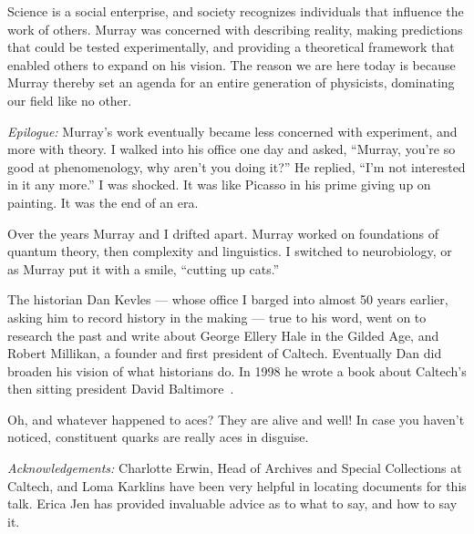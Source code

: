 \documentclass[12pt]{article}
\begin{document}
Science is a social enterprise, and society recognizes individuals that influence the work of others. Murray was concerned with describing reality, making predictions that could be tested experimentally, and providing a theoretical framework that enabled others to expand on his vision. The reason we are here today is because Murray thereby set an agenda for an entire generation of physicists, dominating our field like no other.

{\it Epilogue:} Murray's work eventually became less concerned with experiment, and more with theory. I walked into his office one day and asked, ``Murray, you're so good at phenomenology, why aren't you doing it?'' He replied, ``I'm not interested in it any more.'' I was shocked. It was like Picasso in his prime giving up on painting. It was the end of an era.

Over the years Murray and I drifted apart.
Murray worked on foundations of quantum theory, then complexity and linguistics.  I switched to neurobiology, or as Murray put it with a smile, ``cutting up cats.''

The historian Dan Kevles --- whose office I barged into almost 50 years earlier, asking him to record history in the making --- true to his word, went on to research the past and write about George Ellery Hale in the Gilded Age, and Robert Millikan, a founder and first president of Caltech.
Eventually Dan did broaden his vision of what historians do. In 1998 he wrote a book about Caltech's then sitting president David Baltimore~\cite{DKbaltimore}.

Oh, and whatever happened to aces? They are alive and well! In case you haven't noticed,  constituent quarks are really aces in disguise.

{\it Acknowledgements:} Charlotte Erwin, Head of Archives and Special Collections at Caltech, and Loma Karklins have been very helpful in locating documents for this talk. Erica Jen has provided invaluable advice as to what to say, and how to say it.
\end{document}
